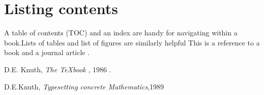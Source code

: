 \documentclass{article}
\begin{document}
	\section{Listing contents}
	A table of contents (TOC)  and an index are handy for
	navigating
	within a book.Lists of tables and list of figures are similarly helpful
	This is a reference to a book \cite{DK86} and a journal article \cite{DK89}.
	\begin{thebibliography}{10} D.E. Knuth, \emph{The {\TeX}book} ,
		1986 .
		
		 D.E.Knuth, \emph{Typesetting concrete Mathematics},1989
	\end{thebibliography}
\end{document}
